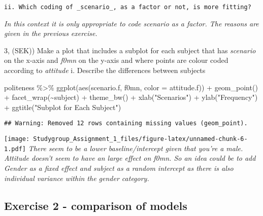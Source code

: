 \documentclass[
]{article}
\newenvironment{Shaded}{\begin{snugshade}}{\end{snugshade}}
\newcommand{\AttributeTok}[1]{\textcolor[rgb]{0.77,0.63,0.00}{#1}}
\newcommand{\FunctionTok}[1]{\textcolor[rgb]{0.00,0.00,0.00}{#1}}
\newcommand{\NormalTok}[1]{#1}
\newcommand{\SpecialCharTok}[1]{\textcolor[rgb]{0.00,0.00,0.00}{#1}}
\newcommand{\StringTok}[1]{\textcolor[rgb]{0.31,0.60,0.02}{#1}}
\begin{document}
\begin{verbatim}
ii. Which coding of _scenario_, as a factor or not, is more fitting?
\end{verbatim}

\emph{In this context it is only appropriate to code scenario as a
factor. The reasons are given in the previous exercise.}

3, (SEK)) Make a plot that includes a subplot for each subject that has
\emph{scenario} on the x-axis and \emph{f0mn} on the y-axis and where
points are colour coded according to \emph{attitude} i. Describe the
differences between subjects

\begin{Shaded}
\begin{Highlighting}[]
\NormalTok{politeness }\SpecialCharTok{\%\textgreater{}\%} 
    \FunctionTok{ggplot}\NormalTok{(}\FunctionTok{aes}\NormalTok{(scenario.f, f0mn, }\AttributeTok{color =}\NormalTok{ attitude.f)) }\SpecialCharTok{+} \FunctionTok{geom\_point}\NormalTok{() }\SpecialCharTok{+}
    \FunctionTok{facet\_wrap}\NormalTok{(}\SpecialCharTok{\textasciitilde{}}\NormalTok{subject) }\SpecialCharTok{+}
  \FunctionTok{theme\_bw}\NormalTok{() }\SpecialCharTok{+}
  \FunctionTok{xlab}\NormalTok{(}\StringTok{"Scenarios"}\NormalTok{) }\SpecialCharTok{+}
  \FunctionTok{ylab}\NormalTok{(}\StringTok{"Frequency"}\NormalTok{) }\SpecialCharTok{+}
  \FunctionTok{ggtitle}\NormalTok{(}\StringTok{"Subplot for Each Subject"}\NormalTok{) }
\end{Highlighting}
\end{Shaded}

\begin{verbatim}
## Warning: Removed 12 rows containing missing values (geom_point).
\end{verbatim}

\texttt{[image: Studygroup\_Assignment\_1\_files/figure-latex/unnamed-chunk-6-1.pdf]}
\emph{There seem to be a lower baseline/intercept given that you're a
male. Attitude doesn't seem to have an large effect on f0mn. So an idea
could be to add Gender as a fixed effect and subject as a random
intercept as there is also individual variance within the gender
category.}

\hypertarget{exercise-2---comparison-of-models}{%
\subsection{Exercise 2 - comparison of
models}\label{exercise-2---comparison-of-models}}
\end{document}

